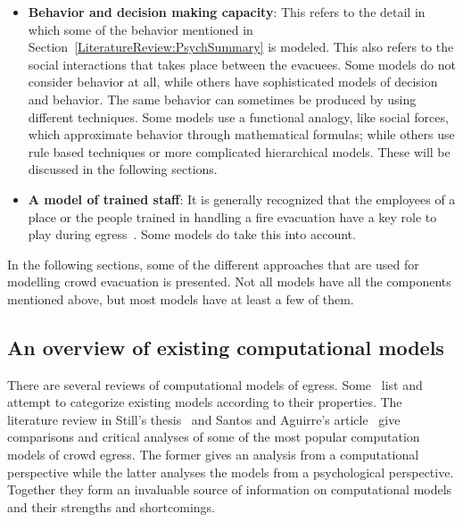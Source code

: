 \begin{itemize}
\item \textbf{Behavior and decision making capacity}: This refers to the detail in which some of the behavior mentioned in Section~\ref{LiteratureReview:PsychSummary} is modeled. This also refers to the social interactions that takes place between the evacuees. Some models do not consider behavior at all, while others have sophisticated models of decision and behavior. The same behavior can sometimes be produced by using different techniques. Some models use a functional analogy, like social forces, which approximate behavior through mathematical formulas; while others use rule based techniques or more complicated hierarchical models. These will be discussed in the following sections.

\item \textbf{A model of trained staff}: It is generally recognized that the employees of a place or the people trained in handling a fire evacuation have a key role to play during egress~\cite{Paulsen:1984ti,Aguirre:2004tn,Andree:2008td,Proulx:2001we}. Some models do take this into account.

\end{itemize}

In the following sections, some of the different approaches that are used for modelling crowd evacuation is presented. Not all models have all the components mentioned above, but most models have at least a few of them.

\subsection{An overview of existing computational models}
\label{LiteratureReview:ExistingModelsSummary}

There are several reviews of computational models of egress. Some~\cite{WattsJr:1987tx,Gwynne:1999vi,Kuligowski:2005tt,Schadschneider:2008cz,Zheng:2009id} list and attempt to categorize existing models according to their properties. The literature review in Still's thesis~\cite{Still:2000tp} and Santos and Aguirre's article~\cite{Aguirre:2004tn} give comparisons and critical analyses of some of the most popular computation models of crowd egress. The former gives an analysis from a computational perspective while the latter analyses the models from a psychological perspective. Together they form an invaluable source of information on computational models and their strengths and shortcomings.

